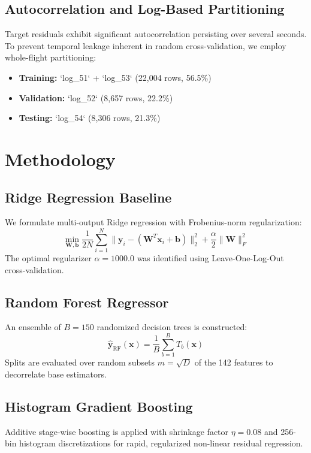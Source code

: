 \documentclass[conference]{IEEEtran}
\begin{document}
\subsection{Autocorrelation and Log-Based Partitioning}
Target residuals exhibit significant autocorrelation persisting over several seconds. To prevent temporal leakage inherent in random cross-validation, we employ whole-flight partitioning:
\begin{itemize}
    \item \textbf{Training:} `log\_51` + `log\_53` (22,004 rows, 56.5\%)
    \item \textbf{Validation:} `log\_52` (8,657 rows, 22.2\%)
    \item \textbf{Testing:} `log\_54` (8,306 rows, 21.3\%)
\end{itemize}

\section{Methodology}
\subsection{Ridge Regression Baseline}
We formulate multi-output Ridge regression with Frobenius-norm regularization:
\begin{equation}
\min_{\mathbf{W}, \mathbf{b}} \frac{1}{2N} \sum_{i=1}^N \|\mathbf{y}_i - (\mathbf{W}^T \mathbf{x}_i + \mathbf{b})\|_2^2 + \frac{\alpha}{2} \|\mathbf{W}\|_F^2
\end{equation}
The optimal regularizer $\alpha=1000.0$ was identified using Leave-One-Log-Out cross-validation.

\subsection{Random Forest Regressor}
An ensemble of $B=150$ randomized decision trees is constructed:
\begin{equation}
\hat{\mathbf{y}}_{\text{RF}}(\mathbf{x}) = \frac{1}{B} \sum_{b=1}^B T_b(\mathbf{x})
\end{equation}
Splits are evaluated over random subsets $m = \sqrt{D}$ of the 142 features to decorrelate base estimators.

\subsection{Histogram Gradient Boosting}
Additive stage-wise boosting is applied with shrinkage factor $\eta=0.08$ and 256-bin histogram discretizations for rapid, regularized non-linear residual regression.
\end{document}
